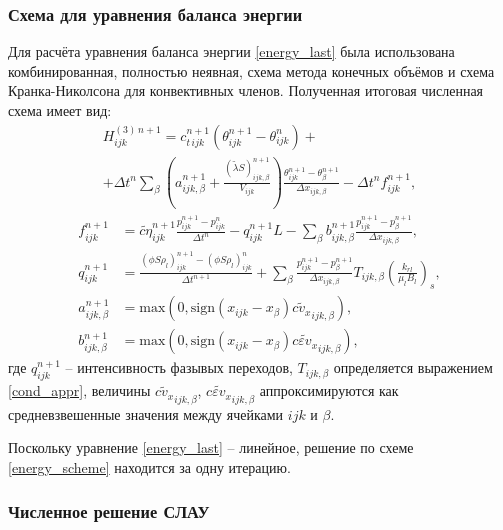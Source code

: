 \subsubsection{Схема для уравнения баланса энергии}
	Для расчёта уравнения баланса энергии \eqref{energy_last} была использована комбинированная, полностью неявная, схема метода конечных объёмов и схема Кранка-Николсона \cite{petrov} для конвективных членов.
	Полученная итоговая численная схема имеет вид:
\begin{multline}
	\label{energy_scheme}
	H_{ijk}^{(3)\,n+1} = c_{t\, ijk}^{n+1}\left(\theta_{ijk}^{n+1}-\theta_{ijk}^{n}\right) + \\
	+\Delta t^n\sum\limits_{\beta}\left(a_{ijk, \beta}^{n+1}+\frac{\left(\tilde{\lambda}S\right)_{ijk, \beta}^{n+1}}{V_{ijk}}\right)
	\frac{\theta_{ijk}^{n+1}-\theta_{\beta}^{n+1}}{\Delta x_{ijk, \beta}}-\Delta t^{n} f_{ijk}^{n+1},
\end{multline}
\begin{align}
	\label{energy_scheme_terms}
	f_{ijk}^{n+1} &= \widetilde{c\eta}_{ijk}^{n+1}\frac{p_{ijk}^{n+1}-p_{ijk}^{n}}{\Delta t^{n}}-q_{ijk}^{n+1}L - 
	\sum\limits_{\beta}b_{ijk, \beta}^{n+1}\frac{p_{ijk}^{n+1}-p_{\beta}^{n+1}}{\Delta x_{ijk, \beta}},\nonumber\\
	q_{ijk}^{n+1} &= \frac{\left(\phi S \rho_l\right)_{ijk}^{n+1}-\left(\phi S \rho_l\right)_{ijk}^{n}}{\Delta t^{n+1}}+
	\sum\limits_{\beta}\frac{p_{ijk}^{n+1}-p_{\beta}^{n+1}}{\Delta x_{ijk, \beta}}T_{ijk, \beta}\left(\frac{k_{rl}}{\mu_l B_l}\right)_s,\nonumber\\
	a_{ijk, \beta}^{n+1}&=\text{max}\left(0, \text{sign}(x_{ijk}-x_{\beta})\widetilde{c v_x}_{ijk, \beta}\right),\nonumber\\
	b_{ijk, \beta}^{n+1}&=\text{max}\left(0, \text{sign}(x_{ijk}-x_{\beta})\widetilde{c \varepsilon v_x}_{ijk, \beta}\right),
\end{align}
	где $q_{ijk}^{n+1}$ -- интенсивность фазывых переходов,
	$T_{ijk, \beta}$ определяется выражением \eqref{cond_appr},
	величины $\widetilde{c v_x}_{ijk, \beta}$, $\widetilde{c \varepsilon v_x}_{ijk, \beta}$ аппроксимируются как средневзвешенные значения между ячейками $ijk$ и $\beta$.

	Поскольку уравнение \eqref{energy_last} -- линейное, решение по схеме \eqref{energy_scheme} находится за одну итерацию.

\subsubsection{Численное решение СЛАУ}

